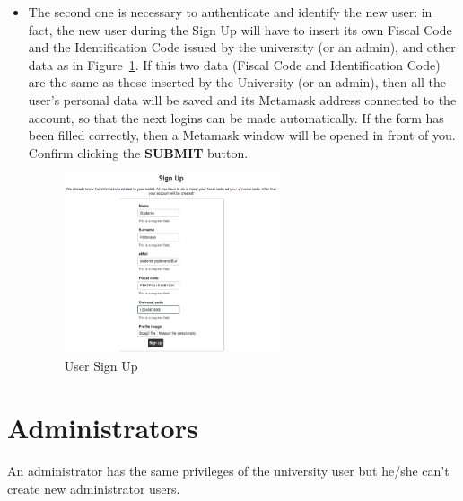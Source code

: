 \begin{itemize}
	\item The second one is necessary to authenticate and identify the new user: in fact, the  new user during the Sign Up will have to insert its own Fiscal Code and the Identification Code issued by the university (or an admin), and other data as in Figure~\ref{fig:stdSignUp}. If this two data (Fiscal Code and Identification Code) are the same as those inserted by the University (or an admin), then all the user's personal data will be saved and its Metamask address connected to the account, so that the next logins can be made automatically.
	If the form has been filled correctly, then a Metamask window will be opened in front of you. Confirm clicking the \textbf{SUBMIT} button.
	\begin{figure}[H]
		\centering
		\includegraphics[width=0.60\textwidth]{img/stdSignUp.png}
		\caption{User Sign Up}
		\label{fig:stdSignUp}
	\end{figure}
\end{itemize}

\newpage
\section{Administrators}
An administrator has the same privileges of the university user but he/she can't create new administrator users.







